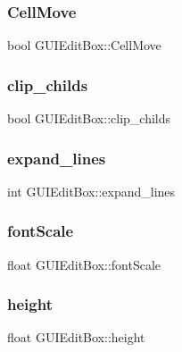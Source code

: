 \subsubsection{\texorpdfstring{Cell\+Move}{CellMove}}
{\footnotesize\ttfamily bool G\+U\+I\+Edit\+Box\+::\+Cell\+Move}

\hypertarget{class_g_u_i_edit_box_a24234b81f3841913d4c2487edfdde29a}{}\label{class_g_u_i_edit_box_a24234b81f3841913d4c2487edfdde29a} 
\subsubsection{\texorpdfstring{clip\+\_\+childs}{clip\_childs}}
{\footnotesize\ttfamily bool G\+U\+I\+Edit\+Box\+::clip\+\_\+childs}

\hypertarget{class_g_u_i_edit_box_acddc6998ac50301e0d5752424f889a30}{}\label{class_g_u_i_edit_box_acddc6998ac50301e0d5752424f889a30} 
\subsubsection{\texorpdfstring{expand\+\_\+lines}{expand\_lines}}
{\footnotesize\ttfamily int G\+U\+I\+Edit\+Box\+::expand\+\_\+lines}

\hypertarget{class_g_u_i_edit_box_adb781f6b13eb6614ada65ed4c94a5df1}{}\label{class_g_u_i_edit_box_adb781f6b13eb6614ada65ed4c94a5df1} 
\subsubsection{\texorpdfstring{font\+Scale}{fontScale}}
{\footnotesize\ttfamily float G\+U\+I\+Edit\+Box\+::font\+Scale}

\hypertarget{class_g_u_i_edit_box_a1473df732c66fa521edc681619efe248}{}\label{class_g_u_i_edit_box_a1473df732c66fa521edc681619efe248} 
\subsubsection{\texorpdfstring{height}{height}}
{\footnotesize\ttfamily float G\+U\+I\+Edit\+Box\+::height}

